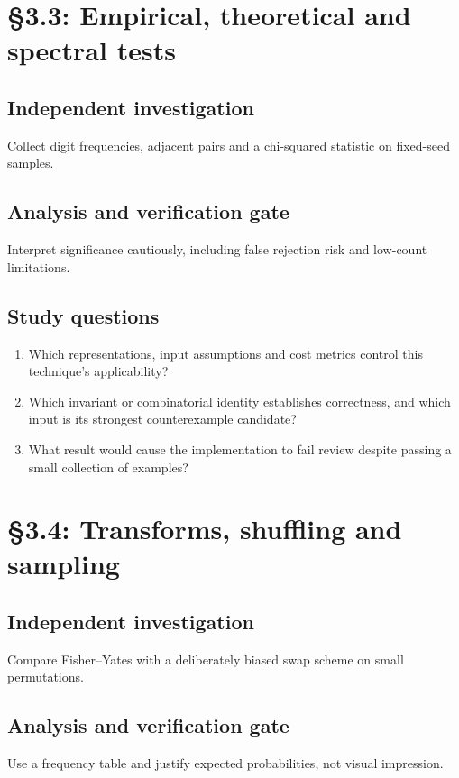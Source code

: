 \documentclass[11pt,letterpaper]{article}
\begin{document}
\section{\S 3.3: Empirical, theoretical and spectral tests}
\subsection{Independent investigation}
Collect digit frequencies, adjacent pairs and a chi-squared statistic on fixed-seed samples.
\subsection{Analysis and verification gate}
Interpret significance cautiously, including false rejection risk and low-count limitations.
\subsection{Study questions}
\begin{enumerate}
\item Which representations, input assumptions and cost metrics control this technique's applicability?
\item Which invariant or combinatorial identity establishes correctness, and which input is its strongest counterexample candidate?
\item What result would cause the implementation to fail review despite passing a small collection of examples?
\end{enumerate}

\section{\S 3.4: Transforms, shuffling and sampling}
\subsection{Independent investigation}
Compare Fisher--Yates with a deliberately biased swap scheme on small permutations.
\subsection{Analysis and verification gate}
Use a frequency table and justify expected probabilities, not visual impression.
\end{document}
